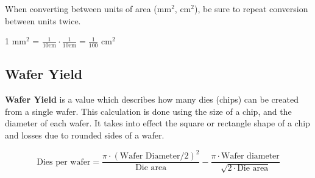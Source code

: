 \documentclass[11pt]{article}
\begin{document}
When converting between units of area (mm$^2$, cm$^2$), be sure to repeat conversion between units twice.

\begin{center}
    1 mm$^2$ = $\frac{1}{10 \text{cm}} \cdot \frac{1}{10 \text{cm}} = \frac{1}{100}$ cm$^2$
\end{center}

\subsection{Wafer Yield}

\textbf{Wafer Yield} is a value which describes how many dies (chips) can be created from a single wafer. This calculation is done using the size of a chip, and the diameter of each wafer. It takes into effect the square or rectangle shape of a chip and losses due to rounded sides of a wafer.

\begin{center}
\begin{equation} \text{Dies per wafer} = 
    \frac{\pi \cdot (\text{Wafer Diameter}/2)^2}{\text{Die area}} - \frac{\pi \cdot \text{Wafer diameter}}{\sqrt{2 \cdot \text{Die area}}}    
\end{equation}
\end{center}
\end{document}
